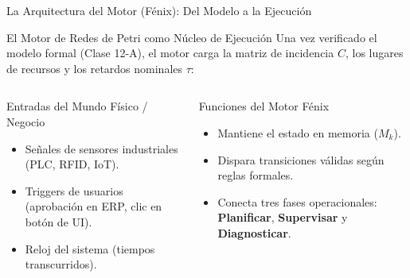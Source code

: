\documentclass[10pt, aspectratio=169]{beamer}
\begin{document}
\begin{frame}{La Arquitectura del Motor (Fénix): Del Modelo a la Ejecución}
	\begin{block}{El Motor de Redes de Petri como Núcleo de Ejecución}
		Una vez verificado el modelo formal (Clase 12-A), el motor carga la matriz de incidencia $C$, los lugares de recursos y los retardos nominales $\tau$:
	\end{block}

	\begin{columns}
		\begin{block}{Entradas del Mundo Físico / Negocio}
			\begin{itemize}
				\item Señales de sensores industriales (PLC, RFID, IoT).
				\item Triggers de usuarios (aprobación en ERP, clic en botón de UI).
				\item Reloj del sistema (tiempos transcurridos).
			\end{itemize}
		\end{block}

		\begin{alertblock}{Funciones del Motor Fénix}
			\begin{itemize}
				\item Mantiene el estado en memoria ($M_k$).
				\item Dispara transiciones válidas según reglas formales.
				\item Conecta tres fases operacionales: \textbf{Planificar}, \textbf{Supervisar} y \textbf{Diagnosticar}.
			\end{itemize}
		\end{alertblock}
	\end{columns}
\end{frame}
\end{document}
